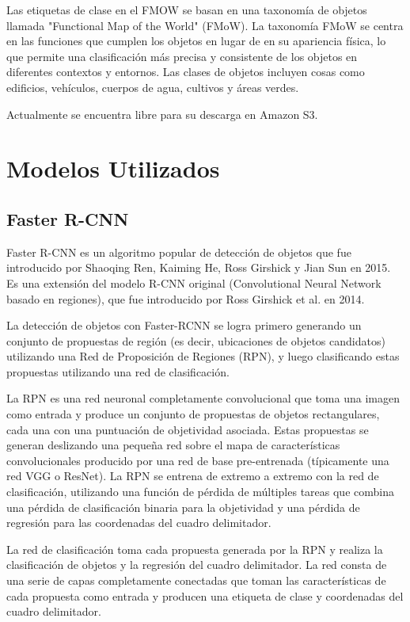 \documentclass[article]{llncs}
\begin{document}
Las etiquetas de clase en el FMOW se basan en una taxonomía de objetos llamada "Functional Map of the World" (FMoW). La 
taxonomía FMoW se centra en las funciones que cumplen los objetos en lugar de en su apariencia física, lo que permite 
una clasificación más precisa y consistente de los objetos en diferentes contextos y entornos. Las clases de objetos 
incluyen cosas como edificios, vehículos, cuerpos de agua, cultivos y áreas verdes.

Actualmente se encuentra libre para su descarga en Amazon S3.

\section{Modelos Utilizados}

\subsection{Faster R-CNN}
Faster R-CNN es un algoritmo popular de detección de objetos que fue introducido por Shaoqing Ren, 
Kaiming He, Ross Girshick y Jian Sun en 2015. Es una extensión del modelo R-CNN original (Convolutional Neural 
Network basado en regiones), que fue introducido por Ross Girshick et al. en 2014.

La detección de objetos con Faster-RCNN se logra primero generando un conjunto de propuestas de región 
(es decir, ubicaciones de objetos candidatos) utilizando una Red de Proposición de Regiones (RPN), y luego 
clasificando estas propuestas utilizando una red de clasificación.

La RPN es una red neuronal completamente convolucional que toma una imagen como entrada y produce un conjunto de 
propuestas de objetos rectangulares, cada una con una puntuación de objetividad asociada. Estas propuestas se generan 
deslizando una pequeña red sobre el mapa de características convolucionales producido por una red de base pre-entrenada 
(típicamente una red VGG o ResNet). La RPN se entrena de extremo a extremo con la red de clasificación, utilizando una 
función de pérdida de múltiples tareas que combina una pérdida de clasificación binaria para la objetividad y una 
pérdida de regresión para las coordenadas del cuadro delimitador.

La red de clasificación toma cada propuesta generada por la RPN y realiza la clasificación de objetos y la regresión 
del cuadro delimitador. La red consta de una serie de capas completamente conectadas que toman las características de 
cada propuesta como entrada y producen una etiqueta de clase y coordenadas del cuadro delimitador.
\end{document}
